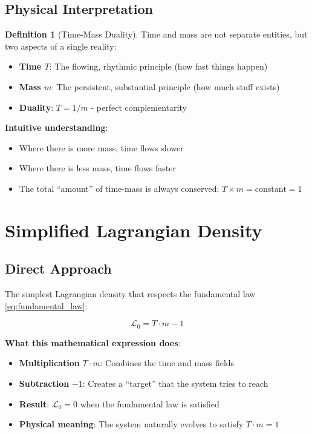 \documentclass[12pt,a4paper]{article}
\newcommand{\Lag}{\mathcal{L}}
\theoremstyle{definition}
\newtheorem{definition}[theorem]{Definition}
\theoremstyle{remark}
\begin{document}
	\subsection{Physical Interpretation}
	
	\begin{definition}[Time-Mass Duality]
		Time and mass are not separate entities, but two aspects of a single reality:
		\begin{itemize}
			\item \textbf{Time $T$}: The flowing, rhythmic principle (how fast things happen)
			\item \textbf{Mass $m$}: The persistent, substantial principle (how much stuff exists)
			\item \textbf{Duality}: $T = 1/m$ - perfect complementarity
		\end{itemize}
	\end{definition}
	
	\textbf{Intuitive understanding}: 
	\begin{itemize}
		\item Where there is more mass, time flows slower
		\item Where there is less mass, time flows faster  
		\item The total ``amount'' of time-mass is always conserved: $T \times m = \text{constant} = 1$
	\end{itemize}
	
	\section{Simplified Lagrangian Density}
	
	\subsection{Direct Approach}
	
	The simplest Lagrangian density that respects the fundamental law \eqref{eq:fundamental_law}:
	
	\begin{equation}
		\boxed{\Lag_0 = T \cdot m - 1}
		\label{eq:simple_lagrangian}
	\end{equation}
	
	\textbf{What this mathematical expression does}:
	\begin{itemize}
		\item \textbf{Multiplication} $T \cdot m$: Combines the time and mass fields
		\item \textbf{Subtraction} $-1$: Creates a ``target'' that the system tries to reach
		\item \textbf{Result}: $\Lag_0 = 0$ when the fundamental law is satisfied
		\item \textbf{Physical meaning}: The system naturally evolves to satisfy $T \cdot m = 1$
	\end{itemize}
	
\end{document}
